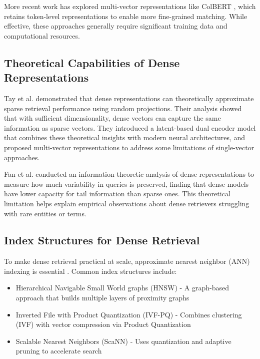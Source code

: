 \documentclass[conference,anonymous]{IEEEtran}
\begin{document}
More recent work has explored multi-vector representations like ColBERT \cite{khattab2020colbert}, which retains token-level representations to enable more fine-grained matching. While effective, these approaches generally require significant training data and computational resources.

\subsection{Theoretical Capabilities of Dense Representations}
Tay et al. \cite{tay2020sparse} demonstrated that dense representations can theoretically approximate sparse retrieval performance using random projections. Their analysis showed that with sufficient dimensionality, dense vectors can capture the same information as sparse vectors. They introduced a latent-based dual encoder model that combines these theoretical insights with modern neural architectures, and proposed multi-vector representations to address some limitations of single-vector approaches.

Fan et al. \cite{fan2022information} conducted an information-theoretic analysis of dense representations to measure how much variability in queries is preserved, finding that dense models have lower capacity for tail information than sparse ones. This theoretical limitation helps explain empirical observations about dense retrievers struggling with rare entities or terms.

\subsection{Index Structures for Dense Retrieval}
To make dense retrieval practical at scale, approximate nearest neighbor (ANN) indexing is essential \cite{johnson2019billion}. Common index structures include:
\begin{itemize}
\item Hierarchical Navigable Small World graphs (HNSW) \cite{malkov2019efficient} - A graph-based approach that builds multiple layers of proximity graphs

\item Inverted File with Product Quantization (IVF-PQ) - Combines clustering (IVF) with vector compression via Product Quantization \cite{jegou2010product}

\item Scalable Nearest Neighbors (ScaNN) - Uses quantization and adaptive pruning to accelerate search
\end{itemize}
\end{document}
